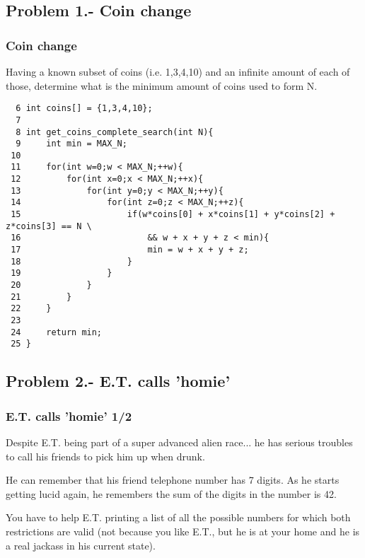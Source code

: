 \documentclass[article]{beamer}
\begin{document}
\subsection{Problem 1.- Coin change}

\begin{frame}[fragile]
	\frametitle{Coin change}
	{\footnotesize
	Having a known subset of coins (i.e. 1,3,4,10) and an infinite amount of each of those,
	determine what is the minimum amount of coins used to form N. 
	
	{\tiny
	\begin{lstlisting}
  6 int coins[] = {1,3,4,10};
  7 
  8 int get_coins_complete_search(int N){
  9     int min = MAX_N;
 10     
 11     for(int w=0;w < MAX_N;++w){
 12         for(int x=0;x < MAX_N;++x){
 13             for(int y=0;y < MAX_N;++y){
 14                 for(int z=0;z < MAX_N;++z){
 15                     if(w*coins[0] + x*coins[1] + y*coins[2] + z*coins[3] == N \
 16                         && w + x + y + z < min){
 17                         min = w + x + y + z;
 18                     }
 19                 }
 20             }
 21         }
 22     }
 23     
 24     return min;
 25 }
	\end{lstlisting}
	}
	}
\end{frame}

\subsection{Problem 2.- E.T. calls 'homie'}

\begin{frame}[fragile]
	\frametitle{E.T. calls 'homie' 1/2}
	{\footnotesize
	Despite E.T. being part of a super advanced alien race... he has
	serious troubles to call his friends to pick him up when drunk. 
	\newline
	
	He can remember that his friend telephone number has 7 digits. 
	As he starts getting lucid again, he remembers the sum of the digits in the number is 42. 
	\newline
	
	You have to help E.T. printing a list of all the possible numbers for which
	both restrictions are valid (not because you like E.T., but he is at your home 
	and he is a real jackass in his current state). 
	}
\end{frame}
\end{document}
